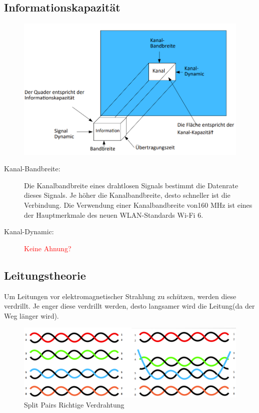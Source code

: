 \documentclass[12pt,a4paper]{article}
\begin{document}
		\subsection{Informationskapazität}
		\begin{center}
			\begin{figure}[!h]
				\includegraphics[width=\textwidth]{Bilder/Informationskapazitaet.png}
			\end{figure}
		\end{center}
		\begin{description}
			\item[Kanal-Bandbreite: ] Die Kanalbandbreite eines drahtlosen Signals bestimmt die Datenrate dieses Signals. Je höher die Kanalbandbreite, desto schneller ist die Verbindung. Die Verwendung einer Kanalbandbreite von160 MHz ist eines der Hauptmerkmale des neuen WLAN-Standards Wi-Fi 6.
			\item[Kanal-Dynamic: ] \textcolor{red}{Keine Ahnung?}
		\end{description}

		\subsection{Leitungstheorie}
			Um Leitungen vor elektromagnetischer Strahlung zu schützen, werden diese verdrillt. Je enger diese verdrillt werden, desto langsamer wird die Leitung(da der Weg länger wird).
			\begin{center}
				\begin{figure}[!h]
					\includegraphics[width=\textwidth]{Bilder/verdrillte-kabel.PNG}
					Split Pairs \hspace{0.4\textwidth} Richtige Verdrahtung
				\end{figure}
			\end{center}
		
\end{document}
